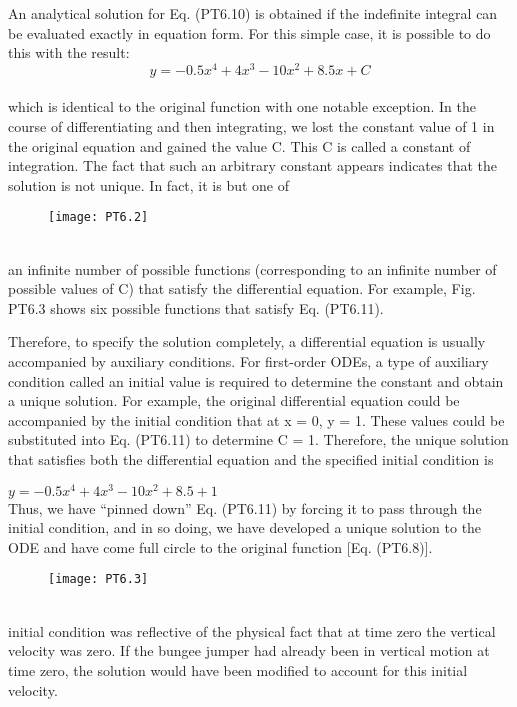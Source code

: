 \documentclass[../main.tex]{subfiles}
\begin{document}
An analytical solution for Eq. (PT6.10) is obtained if the indefinite integral can be evaluated exactly in equation form. For this simple case, it is possible to do this with the result:\\
\begin{equation}
\tag{PT6.11}
y=-0.5x^4 + 4x^3 - 10x^2 + 8.5x + C
\end{equation}\\
which is identical to the original function with one notable exception. In the course of differentiating and then integrating, we lost the constant value of 1 in the original equation
and gained the value C. This C is called a constant of integration. The fact that such an
arbitrary constant appears indicates that the solution is not unique. In fact, it is but one of\\
\pagebreak
\begin{figure}[hbt!]
	\texttt{[image: PT6.2]}
	\label{PT6.2}
\end{figure}\\
an infinite number of possible functions (corresponding to an infinite number of possible
values of C) that satisfy the differential equation. For example, Fig. PT6.3 shows six possible functions that satisfy Eq. (PT6.11).

Therefore, to specify the solution completely, a differential equation is usually accompanied by auxiliary conditions. For first-order ODEs, a type of auxiliary condition called
an initial value is required to determine the constant and obtain a unique solution. For
example, the original differential equation could be accompanied by the initial condition
that at x = 0, y = 1. These values could be substituted into Eq. (PT6.11) to determine
C = 1. Therefore, the unique solution that satisfies both the differential equation and the
specified initial condition is

$y=-0.5x^4 + 4x^3 - 10x^2 + 8.5 + 1$\\
Thus, we have “pinned down” Eq. (PT6.11) by forcing it to pass through the initial condition, and in so doing, we have developed a unique solution to the ODE and have come full
circle to the original function [Eq. (PT6.8)].\\
\begin{figure}[hbt!]
	\texttt{[image: PT6.3]}
	\label{PT6.3}
\end{figure}\\
initial condition was reflective of the physical fact that at time zero the vertical velocity
was zero. If the bungee jumper had already been in vertical motion at time zero, the solution would have been modified to account for this initial velocity.
\end{document}
